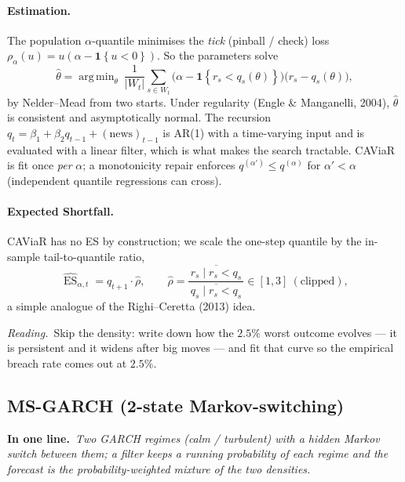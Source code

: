 \documentclass[11pt,a4paper]{article}
\newcommand{\Ind}[1]{\mathbf{1}\!\left\{#1\right\}}
\newcommand{\ES}{\operatorname{ES}}
\DeclareMathOperator*{\argmin}{arg\,min}
\newcommand{\intuition}[1]{\par\smallskip\noindent\textit{Reading.}\ #1\par\smallskip}
\newcommand{\inbrief}[1]{\par\noindent\textbf{In one line.}\ \textit{#1}\par\smallskip}
\begin{document}
\paragraph{Estimation.} The population $\alpha$-quantile minimises the
\emph{tick} (pinball / check) loss $\rho_\alpha(u)=u(\alpha-\Ind{u<0})$. So the
parameters solve
\begin{equation}
  \hat\theta = \argmin_\theta \ \frac{1}{|W_t|}\sum_{s\in W_t}
     \big(\alpha - \Ind{r_s < q_s(\theta)}\big)\big(r_s - q_s(\theta)\big),
\end{equation}
by Nelder--Mead from two starts. Under regularity (Engle \& Manganelli, 2004),
$\hat\theta$ is consistent and asymptotically normal. The recursion
$q_t = \beta_1 + \beta_2 q_{t-1} + (\text{news})_{t-1}$ is AR(1) with a
time-varying input and is evaluated with a linear filter, which is what makes
the search tractable. CAViaR is fit once \emph{per} $\alpha$; a monotonicity
repair enforces $q^{(\alpha')}\le q^{(\alpha)}$ for $\alpha'<\alpha$ (independent
quantile regressions can cross).

\paragraph{Expected Shortfall.} CAViaR has no ES by construction; we scale the
one-step quantile by the in-sample tail-to-quantile ratio,
\begin{equation}
  \widehat{\ES}_{\alpha,t} = q_{t+1}\cdot\hat\rho,
  \qquad
  \hat\rho = \frac{\overline{\,r_s \mid r_s < q_s\,}}{\overline{\,q_s \mid r_s < q_s\,}}
             \in [1,3]\ (\text{clipped}),
\end{equation}
a simple analogue of the Righi--Ceretta (2013) idea.

\intuition{Skip the density: write down how the $2.5\%$ worst outcome evolves
--- it is persistent and it widens after big moves --- and fit that curve so the
empirical breach rate comes out at $2.5\%$.}

\subsection{MS-GARCH (2-state Markov-switching)}\label{sec:msgarch}

\inbrief{Two GARCH regimes (calm / turbulent) with a hidden Markov switch
between them; a filter keeps a running probability of each regime and the
forecast is the probability-weighted mixture of the two densities.}
\end{document}
